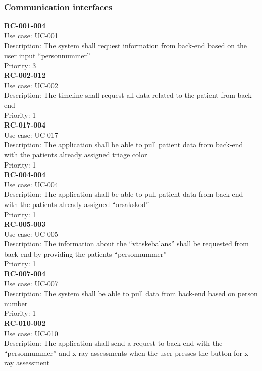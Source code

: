 \subsubsection{Communication interfaces}
\textbf{RC-001-004}\\
Use case: UC-001\\
Description: The system shall request information from back-end based on the user input “personnummer” \\
Priority: 3\\
\newline
\textbf{RC-002-012} \\
Use case: UC-002 \\
Description: The timeline shall request all data related to the patient from back-end \\
Priority: 1 \\
\newline
\textbf{RC-017-004} \\
Use case: UC-017 \\
Description: The application shall be able to pull patient data from back-end with the patients already assigned triage color  \\
Priority: 1 \\
\newline
\textbf{RC-004-004} \\
Use case: UC-004 \\
Description: The application shall be able to pull patient data from back-end with the patients already assigned “orsakskod” \\
Priority: 1 \\
\newline
\textbf{RC-005-003} \\
Use case: UC-005 \\
Description: The information about the “vätskebalans” shall be requested from back-end by providing the patients “personnummer”\\
Priority: 1 \\
\newline
\textbf{RC-007-004} \\
Use case: UC-007 \\
Description: The system shall be able to pull data from back-end based on person number\\
Priority: 1 \\
\newline
\textbf{RC-010-002} \\
Use case: UC-010 \\
Description: The application shall send a request to back-end with the “personnummer” and x-ray assessments when the user presses the button for x-ray assessment \\
